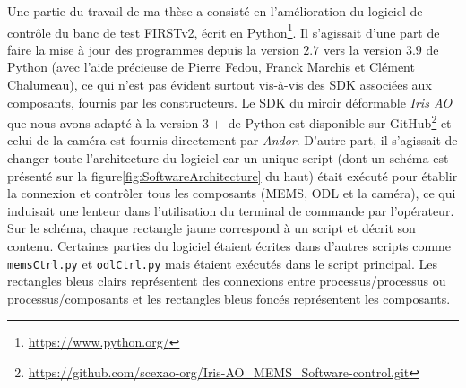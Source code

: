 Une partie du travail de ma thèse a consisté en l'amélioration du logiciel de contrôle du banc de test \ac{FIRSTv2}, écrit en Python\footnote{\url{https://www.python.org/}}. Il s'agissait d'une part de faire la mise à jour des programmes depuis la version $2.7$ vers la version $3.9$ de Python (avec l'aide précieuse de Pierre Fedou, Franck Marchis et Clément Chalumeau), ce qui n'est pas évident surtout vis-à-vis des \ac{SDK} associées aux composants, fournis par les constructeurs. Le \ac{SDK} du miroir déformable \textit{Iris AO} que nous avons adapté à la version $3+$ de Python est disponible sur GitHub\footnote{\url{https://github.com/scexao-org/Iris-AO_MEMS_Software-control.git}} et celui de la caméra est fournis directement par \textit{Andor}. D'autre part, il s'agissait de changer toute l'architecture du logiciel car un unique script (dont un schéma est présenté sur la figure\ref{fig:SoftwareArchitecture} du haut) était exécuté pour établir la connexion et contrôler tous les composants (\ac{MEMS}, \ac{ODL} et la caméra), ce qui induisait une lenteur dans l'utilisation du terminal de commande par l'opérateur. Sur le schéma, chaque rectangle jaune correspond à un script et décrit son contenu. Certaines parties du logiciel étaient écrites dans d'autres scripts comme \texttt{memsCtrl.py} et \texttt{odlCtrl.py} mais étaient exécutés dans le script principal. Les rectangles bleus clairs représentent des connexions entre processus/processus ou processus/composants et les rectangles bleus foncés représentent les composants.

